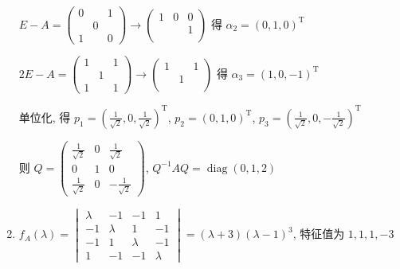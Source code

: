 \begin{enumerate}
                   \( E-A = \begin{pmatrix}
                       0 &   & 1 \\
                         & 0 &   \\
                       1 &   & 0
                   \end{pmatrix} \rightarrow \begin{pmatrix}
                       1 & 0 & 0 \\
                         &   & 1 \\
                         &   &
                   \end{pmatrix} \) 得 \( \alpha_{2} = (0, 1, 0)^{\mathrm{T}} \)

                   \( 2E-A = \begin{pmatrix}
                       1 &   & 1 \\
                         & 1 &   \\
                       1 &   & 1
                   \end{pmatrix} \rightarrow \begin{pmatrix}
                       1 &   & 1 \\
                         & 1 &   \\
                         &   &
                   \end{pmatrix} \) 得 \( \alpha_{3} = (1, 0, -1)^{\mathrm{T}} \)

                   单位化, 得 \( p_{1} = \left( \frac{1}{\sqrt{2}}, 0, \frac{1}{\sqrt{2}} \right)^{\mathrm{T}} \), \( p_{2} = (0, 1, 0)^{\mathrm{T}} \), \( p_{3} = \left( \frac{1}{\sqrt{2}}, 0, -\frac{1}{\sqrt{2}} \right)^{\mathrm{T}} \)

                   则 \( Q = \begin{pmatrix}
                       \frac{1}{\sqrt{2}} & 0 & \frac{1}{\sqrt{2}}  \\
                       0                  & 1 & 0                   \\
                       \frac{1}{\sqrt{2}} & 0 & -\frac{1}{\sqrt{2}}
                   \end{pmatrix} \), \( Q^{-1}AQ = \operatorname{diag}(0, 1, 2) \)
             \item %
                   \( f_{A}(\lambda) = \begin{vmatrix}
                       \lambda & -1      & -1      & 1       \\
                       -1      & \lambda & 1       & -1      \\
                       -1      & 1       & \lambda & -1      \\
                       1       & -1      & -1      & \lambda
                   \end{vmatrix} = (\lambda+3)(\lambda-1)^{3} \), 特征值为 \( 1, 1, 1, -3 \)


\end{enumerate}
